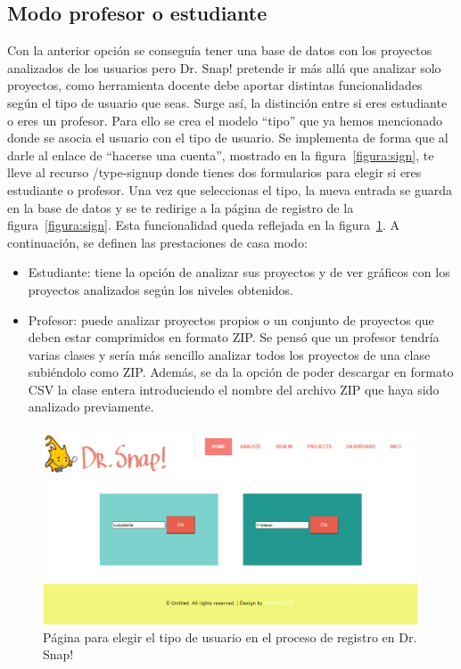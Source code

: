 \documentclass[a4paper, 12pt]{book}
\begin{document}
\subsection{Modo profesor o estudiante}
Con la anterior opción se conseguía tener una base de datos con los proyectos analizados de los usuarios pero Dr. Snap! pretende ir más allá que analizar solo proyectos, como herramienta docente debe aportar distintas funcionalidades según el tipo de usuario que seas. Surge así, la distinción entre si eres estudiante o eres un profesor. Para ello se crea el modelo ``tipo'' que ya hemos mencionado donde se asocia el usuario con el tipo de usuario. Se implementa de forma que al darle al enlace de ``hacerse una cuenta'', mostrado en la figura~\ref{figura:sign}, te lleve al recurso /type-signup donde tienes dos formularios para elegir si eres estudiante o profesor. Una vez que seleccionas el tipo, la nueva entrada se guarda en la base de datos y se te redirige a la página de registro de la figura~\ref{figura:sign}. Esta funcionalidad queda reflejada en la figura~\ref{figura:tipo}. A continuación, se definen las prestaciones de casa modo:

\begin{itemize}
    \item Estudiante: tiene la opción de analizar sus proyectos y de ver gráficos con los proyectos analizados según los niveles obtenidos.
    \item Profesor: puede analizar proyectos propios o un conjunto de proyectos que deben estar comprimidos en formato ZIP. Se pensó que un profesor tendría varias clases y sería más sencillo analizar todos los proyectos de una clase subiéndolo como ZIP. Además, se da la opción de poder descargar en formato CSV la clase entera introduciendo el nombre del archivo ZIP que haya sido analizado previamente.
\end{itemize}

\begin{figure}[h]
\centering
            \includegraphics[scale=0.52]{img/tipo.PNG}
            \caption{Página para elegir el tipo de usuario en el proceso de registro en Dr. Snap!}
            \label{figura:tipo}
    \end{figure}
    
\end{document}

